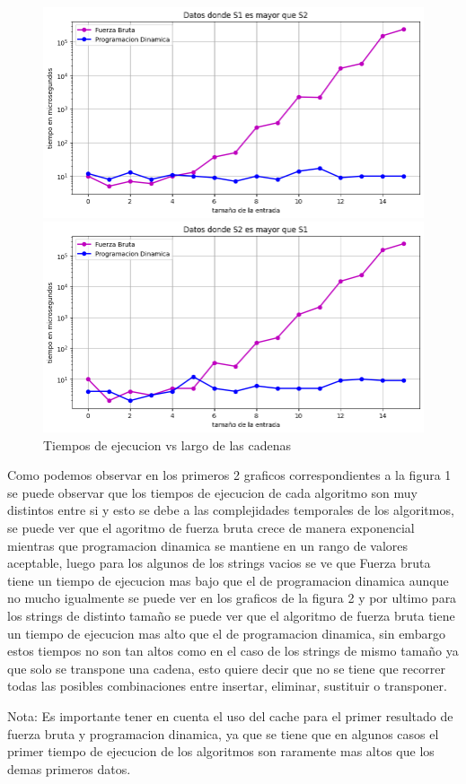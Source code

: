 \begin{figure}[H]
    \centering
    \begin{minipage}[t]{0.5\textwidth}
        \includegraphics[width=\textwidth]{images/s1mayor.png}
    \end{minipage}%
    \begin{minipage}[t]{0.5\textwidth}
        \includegraphics[width=\textwidth]{images/s1menor.png}   \end{minipage}%
    \caption{Tiempos de ejecucion vs largo de las cadenas}
    \label{fig:Tiempos de ejecucion vs largo de las cadenas}
\end{figure}


Como podemos observar en los primeros 2 graficos correspondientes a la figura 1 se puede observar que los tiempos de ejecucion de cada algoritmo son muy distintos
entre si y esto se debe a las complejidades temporales de los algoritmos, se puede ver que el agoritmo de fuerza bruta crece de manera
exponencial mientras que programacion dinamica se mantiene en un rango de valores aceptable, luego para los algunos de los strings
vacios se ve que Fuerza bruta tiene un tiempo de ejecucion mas bajo que el de programacion dinamica aunque no mucho igualmente se puede
ver en los graficos de la figura 2 y por ultimo para los strings de distinto tamaño se puede ver que el algoritmo de fuerza bruta tiene un tiempo 
de ejecucion mas alto que el de programacion dinamica, sin embargo estos tiempos no son tan altos como en el caso de los strings de
mismo tamaño ya que solo se transpone una cadena, esto quiere decir que no se tiene que recorrer todas las posibles combinaciones
entre insertar, eliminar, sustituir o transponer.


Nota: Es importante tener en cuenta el uso del cache para el primer resultado de fuerza bruta y programacion dinamica, ya que
se tiene que en algunos casos el primer tiempo de ejecucion de los algoritmos son raramente mas altos que los demas primeros datos.
